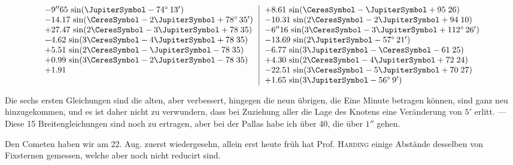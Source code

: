 \[
\setlength{\arraycolsep}{7pt}
\begin{array}{@{}l|l@{}}
\begin{array}[t]{@{}l@{}}
-9''65\,\sin(\JupiterSymbol-74^\circ\,13')\\
-14.17\,\sin(\CeresSymbol-2\JupiterSymbol+78^\circ\,35')\\
+27.47\,\sin(2\CeresSymbol-3\JupiterSymbol+78\;35)\\
-4.62\,\sin(3\CeresSymbol-4\JupiterSymbol+78\;35)\\
+5.51\,\sin(2\CeresSymbol-\JupiterSymbol-78\;35)\\
+0.99\,\sin(3\CeresSymbol-2\JupiterSymbol-78\;35)\\
+1.91
\end{array}
&
\begin{array}[t]{@{}l@{}}
+8.61\,\sin(\CeresSymbol-\JupiterSymbol+95\;26)\\
-10.31\,\sin(2\CeresSymbol-2\JupiterSymbol+94\;10)\\
-6''16\,\sin(3\CeresSymbol-3\JupiterSymbol+112^\circ\,26')\\
-13.69\,\sin(2\JupiterSymbol-57^\circ\,21')\\
-6.77\,\sin(3\JupiterSymbol-\CeresSymbol-61\;25)\\
+4.30\,\sin(2\CeresSymbol-4\JupiterSymbol+72\;24)\\
-22.51\,\sin(3\CeresSymbol-5\JupiterSymbol+70\;27)\\
+1.65\,\sin(3\JupiterSymbol-56^\circ\,9')
\end{array}
\end{array}
\]
\par\indent Die sechs ersten Gleichungen sind die alten, aber verbessert, hingegen die neun übrigen, die Eine Minute betragen können, sind ganz neu hinzugekommen, und es ist daher nicht zu verwundern, dass bei Zuziehung aller die Lage des Knotens eine Veränderung von $5'$ erlitt. — Diese 15 Breitengleichungen sind noch zu ertragen, aber bei der Pallas habe ich über 40, die über $1''$ gehen.\par
\indent Den Cometen haben wir am 22. Aug. zuerst wiedergesehn, allein erst heute früh hat Prof. \textsc{Harding} einige Abstände desselben von Fixsternen gemessen, welche aber noch nicht reducirt sind.
